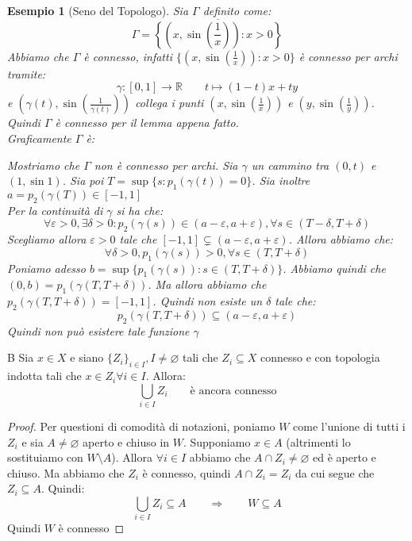 \documentclass[11pt,a4paper,twoside]{article}
\newcommand{\vareps}{\varepsilon}
\newtheorem{es}{Esempio}
\theoremstyle{definition}
\begin{document}
\begin{es}[Seno del Topologo]
	Sia $\Gamma$ definito come:
	\[ \Gamma = \overline{\left\{ \left(x, \sin\left(\frac 1x \right)\right): x>0 \right\}} \]
	Abbiamo che $\Gamma$ è connesso, infatti $\{(x, \sin (\frac1x)):x>0\}$ è connesso per archi tramite:
	\[ \gamma:[0,1] \to \mathbb R\qquad t \mapsto (1-t)x + ty \]
	e $(\gamma(t), \sin(\frac 1{\gamma(t)}))$ collega i punti $(x, \sin(\frac 1x))$ e $(y, \sin(\frac 1y))$. Quindi $\Gamma$ è connesso per il lemma appena fatto.\\
	Graficamente $\Gamma$ è:
	\begin{center}
	\end{center}
	Mostriamo che $\Gamma$ non è connesso per archi. Sia $\gamma$ un cammino tra $(0, t)$ e $(1, \sin 1)$. Sia poi $T = \sup\{ s: p_1(\gamma(t))=0 \}$. Sia inoltre $a = p_2(\gamma(T)) \in [-1,1]$\\
	Per la continuità di $\gamma$ si ha che:
	\[ \forall \vareps>0, \exists \delta >0: p_2(\gamma(s)) \in (a -\vareps, a + \vareps), \forall s \in (T - \delta, T+ \delta) \]
	Scegliamo allora $\vareps>0$ tale che $[-1,1]\subsetneq (a-\vareps, a+\vareps)$. Allora abbiamo che:
	\[ \forall \delta >0, p_1(\gamma(s))>0, \forall s \in (T, T+\delta) \]
	Poniamo adesso $b = \sup\{p_1(\gamma(s)):s \in (T, T+\delta)\}$. Abbiamo quindi che $(0, b) = p_1(\gamma(T, T+\delta))$. Ma allora abbiamo che $p_2(\gamma(T,T+\delta)) = [-1,1]$. Quindi non esiste un $\delta$ tale che:
	\[ p_2(\gamma(T,T+\delta)) \subseteq (a-\vareps, a + \vareps) \]
	Quindi non può esistere tale funzione $\gamma$
\end{es}

\begin{lemma}{B}{}\label{B}
	Sia $x \in X$ e siano $\{Z_i\}_{i \in I}, I \neq \varnothing$ tali che $Z_i\subseteq X$ connesso e con topologia indotta tali che $x \in Z_i \forall i \in I$. Allora:
	\[ \bigcup_{i \in I}Z_i \qquad \text{è ancora connesso} \]
\end{lemma}
\begin{proof}
	Per questioni di comodità di notazioni, poniamo $W$ come l'unione di tutti i $Z_i$ e sia $A \neq \varnothing$ aperto e chiuso in $W$. Supponiamo $x \in A$ (altrimenti lo sostituiamo con $W\setminus A$). Allora $\forall i \in I$ abbiamo che $A \cap Z_i \neq \varnothing$ ed è aperto e chiuso. Ma abbiamo che $Z_i$ è connesso, quindi $A \cap Z_i = Z_i$ da cui segue che $Z_i \subseteq A$. Quindi:
	\[ \bigcup_{i \in I}Z_i \subseteq A\qquad \Rightarrow \qquad W \subseteq A \]
	Quindi $W$ è connesso
\end{proof}
\end{document}

